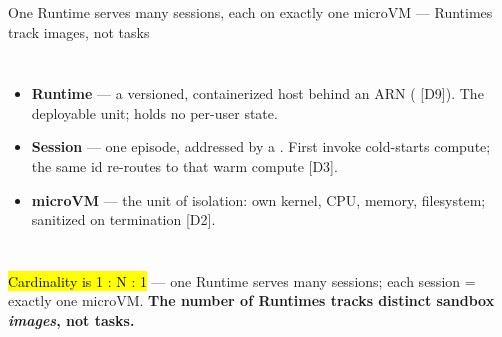 \begin{frame}{One Runtime serves many sessions, each on exactly one microVM --- Runtimes track images, not tasks}
\begin{columns}[T]
\begin{itemize}\footnotesize\setlength{\itemsep}{2mm}
\item \textbf{Runtime} --- a versioned, containerized host behind an ARN ( [D9]). The deployable unit; holds no per-user state.
\item \textbf{Session} --- one episode, addressed by a . First invoke cold-starts compute; the same id re-routes to that warm compute [D3].
\item \textbf{microVM} --- the unit of isolation: own kernel, CPU, memory, filesystem; sanitized on termination [D2].
\end{itemize}
\centering
{}
\end{columns}
\vspace{3mm}
{\small\raggedright\hl{Cardinality is 1 : N : 1} --- one Runtime serves many sessions; each session = exactly one microVM. \textbf{The number of Runtimes tracks distinct sandbox \emph{images}, not tasks.}\par}
\end{frame}

